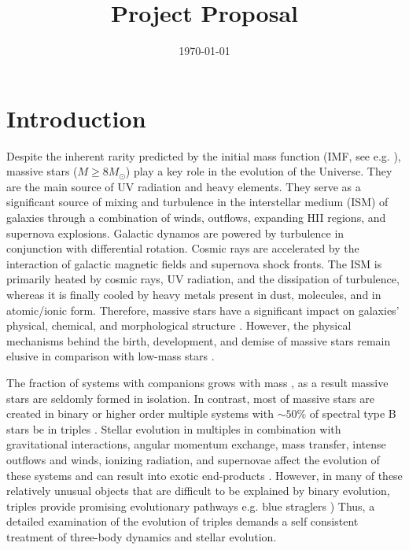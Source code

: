 \documentclass{uva-inf-article}
\title{Project Proposal}
\date{\today}
\numberwithin{equation}{section}
\begin{document}
\maketitle


\section{Introduction}

Despite the inherent rarity predicted by the initial mass function (IMF, see e.g. \cite{chabrier2005initial, dib2018emergence}), massive stars ($M \geq 8M_{\odot}$) play a key role in the evolution of the Universe. They are the main source of UV radiation and heavy elements. They serve as a significant source of mixing and turbulence in the interstellar medium (ISM) of galaxies through a combination of winds, outflows, expanding HII regions, and supernova explosions. Galactic dynamos are powered by turbulence in conjunction with differential rotation. Cosmic rays are accelerated by the interaction of galactic magnetic fields and supernova shock fronts. The ISM is primarily heated by cosmic rays, UV radiation, and the dissipation of turbulence, whereas it is finally cooled by heavy metals present in dust, molecules, and in atomic/ionic form. Therefore, massive stars have a significant impact on galaxies' physical, chemical, and morphological structure \citep{kennicutt2005role}. However, the physical mechanisms behind the birth, development, and demise of massive stars remain elusive in comparison with low-mass stars \citep{zinnecker2007toward}. 

The fraction of systems with companions grows with mass \citep{moe2017mind}, as a result massive stars are seldomly formed in isolation. In contrast, most of massive stars are created in binary or higher order multiple systems with $\sim 50\%$ of spectral type B stars be in triples \citep{moe2017mind}. Stellar evolution in multiples in combination with gravitational interactions, angular momentum exchange, mass transfer, intense outflows and winds, ionizing radiation, and supernovae affect the evolution of these systems and can result into exotic end-products \citep{sana2012binary, toonen2016evolution}. However, in many of these relatively unusual objects that are difficult to be explained by binary evolution, triples provide promising evolutionary pathways e.g. blue straglers \citet{winn2009spin}) Thus, a detailed examination of the evolution of triples demands a self consistent treatment of three-body dynamics and stellar evolution. 
\end{document}
